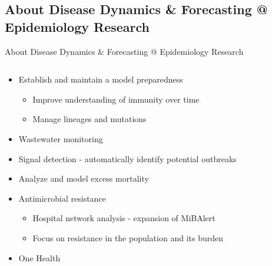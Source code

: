 \documentclass[aspectratio=169]{beamer}
\begin{document}
\hypertarget{about-disease-dynamics-forecasting-epidemiology-research}{%
\subsection{About Disease Dynamics \& Forecasting @ Epidemiology
Research}\label{about-disease-dynamics-forecasting-epidemiology-research}}

\begin{frame}{About Disease Dynamics \& Forecasting @ Epidemiology
Research}
\begin{columns}
\begin{column}{.68\textwidth}
\begin{itemize}
  \item Establish and maintain a model preparedness
  \begin{itemize}
    \item Improve understanding of immunity over time
    \item Manage lineages and mutations
  \end{itemize}
  \item Wastewater monitoring
  \item Signal detection - automatically identify potential outbreaks
  \item Analyze and model excess mortality
  \item Antimicrobial resistance
  \begin{itemize}
    \item Hospital network analysis - expansion of MiBAlert
    \item Focus on resistance in the population and its burden
  \end{itemize}
  \item One Health
\end{itemize}
\end{column}
\hfill
\begin{column}{.28\textwidth}

 \tiny



\end{column}
\end{columns}
\end{frame}
\end{document}

